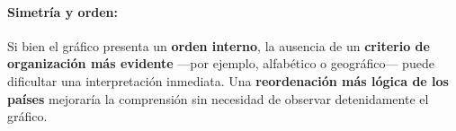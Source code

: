 \documentclass[12pt,a4paper]{article}
\begin{document}
\paragraph{Simetría y orden:}
Si bien el gráfico presenta un \textbf{orden interno}, la ausencia de un \textbf{criterio de organización más evidente} —por ejemplo, alfabético o geográfico— puede dificultar una interpretación inmediata. Una \textbf{reordenación más lógica de los países} mejoraría la comprensión sin necesidad de observar detenidamente el gráfico.
\end{document}
